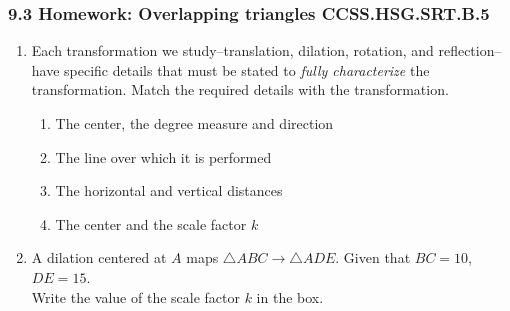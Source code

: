 

\fancyhead[LE]{\thepage}



\subsubsection*{9.3 Homework: Overlapping triangles \hfill CCSS.HSG.SRT.B.5}
\begin{enumerate}
\item Each transformation we study--translation, dilation, rotation, and reflection--have specific details that must be stated to \emph{fully characterize} the transformation. Match the required details with the transformation.
  \begin{enumerate}[itemsep=0.5cm]
  \item The center, the degree measure and direction
  \item The line over which it is performed
  \item The horizontal and vertical distances
  \item The center and the scale factor $k$
  \end{enumerate}

\item A dilation centered at $A$ maps $\triangle ABC \rightarrow \triangle ADE$. Given that $BC = 10$, $DE = 15$.\\[0.5cm]
Write the value of the scale factor $k$ in the box.
    \begin{flushright}
    \end{flushright}


\end{enumerate}
